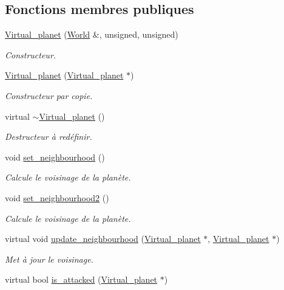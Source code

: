 \subsection*{Fonctions membres publiques}
\begin{DoxyCompactItemize}
\item 
\hyperlink{classVirtual__planet_a16cc8781ce4c81e6365d87b659e5108c}{Virtual\-\_\-planet} (\hyperlink{classWorld}{World} \&, unsigned, unsigned)
\begin{DoxyCompactList}\small\item\em Constructeur. \end{DoxyCompactList}\item 
\hyperlink{classVirtual__planet_a4a2c71c2400d55bf861bc5d433123ac6}{Virtual\-\_\-planet} (\hyperlink{classVirtual__planet}{Virtual\-\_\-planet} $\ast$)
\begin{DoxyCompactList}\small\item\em Constructeur par copie. \end{DoxyCompactList}\item 
\hypertarget{classVirtual__planet_a029ab1668b417b73c57fae8dae82cc1c}{virtual \hyperlink{classVirtual__planet_a029ab1668b417b73c57fae8dae82cc1c}{$\sim$\-Virtual\-\_\-planet} ()}\label{classVirtual__planet_a029ab1668b417b73c57fae8dae82cc1c}

\begin{DoxyCompactList}\small\item\em Destructeur à redéfinir. \end{DoxyCompactList}\item 
\hypertarget{classVirtual__planet_aa17b2d88853c46485a3907f08148ef1e}{void \hyperlink{classVirtual__planet_aa17b2d88853c46485a3907f08148ef1e}{set\-\_\-neighbourhood} ()}\label{classVirtual__planet_aa17b2d88853c46485a3907f08148ef1e}

\begin{DoxyCompactList}\small\item\em Calcule le voisinage de la planète. \end{DoxyCompactList}\item 
void \hyperlink{classVirtual__planet_ae32d3dd758346701d6f8c6f6f8a46925}{set\-\_\-neighbourhood2} ()
\begin{DoxyCompactList}\small\item\em Calcule le voisinage de la planète. \end{DoxyCompactList}\item 
virtual void \hyperlink{classVirtual__planet_ac67c164e630df471819336d2404a99af}{update\-\_\-neighbourhood} (\hyperlink{classVirtual__planet}{Virtual\-\_\-planet} $\ast$, \hyperlink{classVirtual__planet}{Virtual\-\_\-planet} $\ast$)
\begin{DoxyCompactList}\small\item\em Met à jour le voisinage. \end{DoxyCompactList}\item 
\hypertarget{classVirtual__planet_aa0712e85ae6ae7e9f05bd6d943a1a7b4}{virtual bool \hyperlink{classVirtual__planet_aa0712e85ae6ae7e9f05bd6d943a1a7b4}{is\-\_\-attacked} (\hyperlink{classVirtual__planet}{Virtual\-\_\-planet} $\ast$)}\label{classVirtual__planet_aa0712e85ae6ae7e9f05bd6d943a1a7b4}


\end{DoxyCompactItemize}
